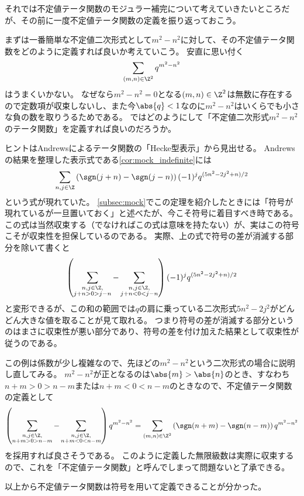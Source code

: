 \documentclass[11pt,b5paper,oneside,lualatex]{ltjsarticle} %
\numberwithin{equation}{section} %
\begin{document}

それでは不定値テータ関数のモジュラー補完について考えていきたいところだが、その前に一度不定値テータ関数の定義を振り返っておこう。

まずは一番簡単な不定値二次形式として$ m^2 - n^2 $に対して、その不定値テータ関数をどのように定義すれば良いか考えていこう。
安直に思い付く
\[
\sum_{(m, n) \in \Z^2} q^{m^2 - n^2}
\]
はうまくいかない。
なぜなら$ m^2 - n^2 = 0 $となる$ (m, n) \in \Z^2 $は無数に存在するので定数項が収束しないし、また今$ \abs{q} < 1 $なのに$ m^2 - n^2 $はいくらでも小さな負の数を取りうるためである。
ではどのようにして「不定値二次形式$ m^2 - n^2 $のテータ関数」を定義すれば良いのだろうか。

ヒントはAndrewsによるテータ関数の「Hecke型表示」から見出せる。
Andrewsの結果を整理した表示式である\cref{cor:mock_indefinite}には
\[
\sum_{n, j \in \Z} \left( \sgn(j+n) - \sgn(j-n) \right) (-1)^j q^{(5n^2 - 2j^2 + n)/2}
\]
という式が現れていた。
\cref{subsec:mock}でこの定理を紹介したときには「符号が現れているが一旦置いておく」と述べたが、今こそ符号に着目すべき時である。
この式は当然収束する（でなければこの式は意味を持たない）が、実はこの符号こそが収束性を担保しているのである。
実際、上の式で符号の差が消滅する部分を除いて書くと
\[
\left( \sum_{\substack{n, j \in \Z, \\ j+n > 0 > j-n}} - \sum_{\substack{n, j \in \Z, \\ j+n < 0 < j-n}} \right) (-1)^j q^{(5n^2 - 2j^2 + n)/2}
\]
と変形できるが、この和の範囲では$ q $の肩に乗っている二次形式$ 5n^2 - 2j^2 $がどんどん大きな値を取ることが見て取れる。
つまり符号の差が消滅する部分というのはまさに収束性が悪い部分であり、符号の差を付け加えた結果として収束性が従うのである。

この例は係数が少し複雑なので、先ほどの$ m^2 - n^2 $という二次形式の場合に説明し直してみる。
$ m^2 - n^2 $が正となるのは$ \abs{m} > \abs{n} $のとき、すなわち$ n+m > 0 > n-m $または$ n+m < 0 < n-m $のときなので、不定値テータ関数の定義として
\[
\left( \sum_{\substack{n, j \in \Z, \\ n+m > 0 > n-m}} - \sum_{\substack{n, j \in \Z, \\ n+m < 0 < n-m}} \right) q^{m^2 - n^2}
=
\sum_{(m, n) \in \Z^2} \left( \sgn(n+m) - \sgn(n-m) \right) q^{m^2 - n^2}
\]
を採用すれば良さそうである。
このように定義した無限級数は実際に収束するので、これを「不定値テータ関数」と呼んでしまって問題ないと了承できる。

以上から不定値テータ関数は符号を用いて定義できることが分かった。
\end{document}
